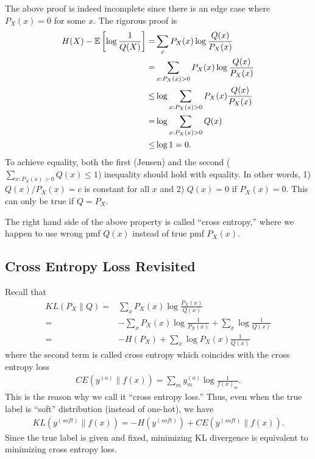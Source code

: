 \documentclass{article}
\begin{document}
\begin{remark}
    The above proof is indeed incomplete since there is an edge case where $P_X(x) = 0$ for some $x$.
    The rigorous proof is
    \begin{align}
        H(X) - \Expec{\log \frac{1}{Q(X)}} =& \sum_{x}P_X(x)\log \frac{Q(x)}{P_X(x)}\\
        =& \sum_{x: P_X(x) > 0} P_X(x)\log \frac{Q(x)}{P_X(x)}\\
        \leq& \log \sum_{x:P_X(x) > 0} P_X(x)\frac{Q(x)}{P_X(x)}\\
        =& \log \sum_{x:P_X(x) > 0} Q(x)\\
        \leq & \log 1 =0.
    \end{align}
    To achieve equality, both the first (Jensen) and the second ($\sum_{x:P_X(x)>0} Q(x) \leq 1$) inequality should hold with equality.
    In other words, 1) $Q(x)/P_X(x)=c$ is constant for all $x$ and 2) $Q(x) = 0$ if $P_X(x) = 0$.
    This can only be true if $Q = P_X$.
\end{remark}

\begin{definition}
    The right hand side of the above property is called ``cross entropy,''
    where we happen to use wrong pmf $Q(x)$ instead of true pmf $P_X(x)$.
\end{definition}

\subsection{Cross Entropy Loss Revisited}
Recall that
\begin{align}
    KL(P_X\|Q) =& \sum_{x} P_X(x) \log \frac{P_X(x)}{Q(x)}\\
    =& -\sum_{x} P_X(x) \log \frac{1}{P_X(x)} + \sum_x \log\frac{1}{Q(x)}\\
    =& -H(P_X) +\sum_x \log P_X(x)\frac{1}{Q(x)}
\end{align}
where the second term is called cross entropy which coincides with the cross entropy loss
\begin{align}
    CE(y^{(o)}\|f(x)) = \sum_m y^{(o)}_m \log \frac{1}{f(x)_m}.
\end{align}
This is the reason why we call it ``cross entropy loss.''
Thus, even when the true label is ``soft'' distribution (instead of one-hot), we have
\begin{align}
    KL(y^{(soft)} \| f(x)) = -H( y^{(soft)}) + CE(y^{(soft)} \| f(x)).
\end{align}
Since the true label is given and fixed, minimizing KL divergence is equivalent to minimizing cross entropy loss.
\end{document}
